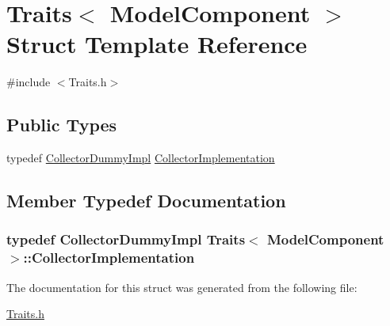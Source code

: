 \hypertarget{struct_traits_3_01_model_component_01_4}{}\section{Traits$<$ Model\+Component $>$ Struct Template Reference}
\label{struct_traits_3_01_model_component_01_4}


{\ttfamily \#include $<$Traits.\+h$>$}

\subsection*{Public Types}
\begin{DoxyCompactItemize}
\item 
typedef \hyperlink{class_collector_dummy_impl}{Collector\+Dummy\+Impl} \hyperlink{struct_traits_3_01_model_component_01_4_a8c9598258cb55519d8ae5755db15e664}{Collector\+Implementation}
\end{DoxyCompactItemize}


\subsection{Member Typedef Documentation}
\subsubsection[{\texorpdfstring{Collector\+Implementation}{CollectorImplementation}}]{\setlength{\rightskip}{0pt plus 5cm}typedef {\bf Collector\+Dummy\+Impl} {\bf Traits}$<$ {\bf Model\+Component} $>$\+::{\bf Collector\+Implementation}}\hypertarget{struct_traits_3_01_model_component_01_4_a8c9598258cb55519d8ae5755db15e664}{}\label{struct_traits_3_01_model_component_01_4_a8c9598258cb55519d8ae5755db15e664}


The documentation for this struct was generated from the following file\+:\begin{DoxyCompactItemize}
\item 
\hyperlink{_traits_8h}{Traits.\+h}\end{DoxyCompactItemize}
